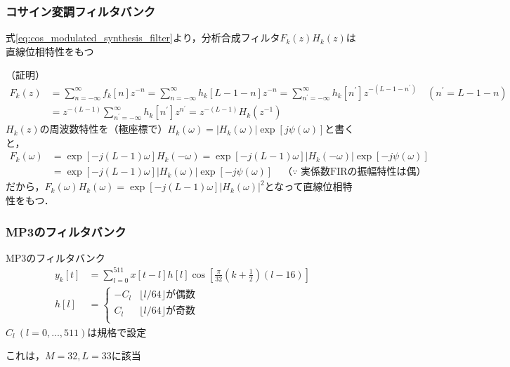 \documentclass[17pt,xcolor=dvipsnames,table,dvipdfmx]{beamer}
\begin{document}
\begin{frame}[c]
    \frametitle{コサイン変調フィルタバンク}
    \begin{block}{}
    式\eqref{eq:cos_modulated_synthesis_filter}より，分析合成フィルタ$F_{k}(z)H_{k}(z)$は直線位相特性をもつ
    \end{block}
    \scriptsize
    （証明）
    \begin{align*}
        F_{k}(z) &= \sum_{n = -\infty}^{\infty} f_{k}[n] z^{-n} = \sum_{n = -\infty}^{\infty} h_{k}[L - 1 - n] z^{-n} = \sum_{n^{\prime} = -\infty}^{\infty} h_{k}[n^{\prime}] z^{-(L - 1 - n^{\prime})} \quad (n^{\prime} = L - 1 - n) \\
        &= z^{-(L-1)} \sum_{n^{\prime} = -\infty}^{\infty} h_{k}[n^{\prime}] z^{n^{\prime}} = z^{-(L-1)} H_{k}(z^{-1})
    \end{align*}
    $H_{k}(z)$の周波数特性を（極座標で）$H_{k}(\omega) = |H_{k}(\omega)| \exp[j \psi(\omega)]$と書くと，
    \begin{align*}
        F_{k}(\omega) &= \exp[-j(L - 1)\omega] H_{k}(-\omega) = \exp[-j(L - 1)\omega] |H_{k}(-\omega)| \exp[-j \psi(\omega)] \\
        &= \exp[-j(L - 1)\omega] |H_{k}(\omega)| \exp[-j \psi(\omega)] \quad \text{（$\because$ 実係数FIRの振幅特性は偶）}
    \end{align*}
    だから，$F_{k}(\omega) H_{k}(\omega) = \exp[-j(L - 1)\omega] |H_{k}(\omega)|^{2}$となって直線位相特性をもつ．
\end{frame}

\begin{frame}[c]
    \frametitle{MP3のフィルタバンク}
    \begin{block}{MP3のフィルタバンク}
        \small
        \begin{align}
            y_{k}[t] &= \sum_{l = 0}^{511} x[t - l] h[l] \cos\left[ \frac{\pi}{32}\left( k + \frac{1}{2} \right) \left( l - 16 \right) \right] \\
            h[l] &= \left\{ \begin{array}{ll}
                -C_{l} & \lfloor l / 64 \rfloor \text{が偶数} \\
                 C_{l} & \lfloor l / 64 \rfloor \text{が奇数} \\
            \end{array} \right.
        \end{align}
        $C_{l}\ (l = 0,...,511)$は規格で設定
    \end{block}
    これは，$M = 32, L = 33$に該当
\end{frame}
\end{document}

